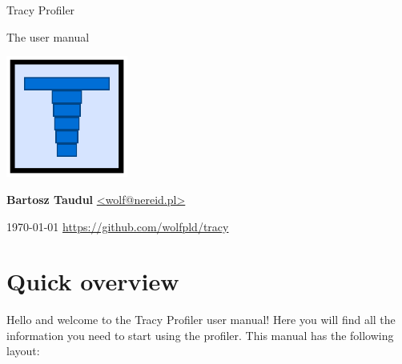 \documentclass[hidelinks,titlepage,a4paper]{article}
\begin{document}
\begin{titlepage}
\centering
{\fontsize{120}{140}\selectfont Tracy Profiler}

\vspace{50pt} {\Huge{}\selectfont The user manual}

\vfill \includegraphics[height=40mm]{../icon/icon}

\vfill
\large\textbf{Bartosz Taudul} \href{mailto:wolf@nereid.pl}{<wolf@nereid.pl>}

\vspace{10pt}
\today
\vfill
\url{https://github.com/wolfpld/tracy}
\end{titlepage}

\section*{Quick overview}

Hello and welcome to the Tracy Profiler user manual! Here you will find all the information you need to start using the profiler. This manual has the following layout:
\end{document}
